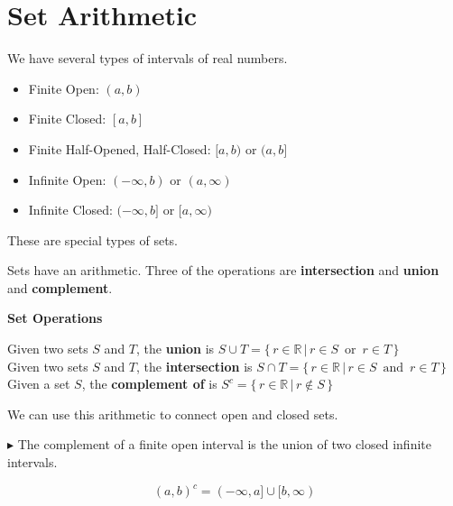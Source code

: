 \documentclass{ximera}
\begin{document}
\section{Set Arithmetic}


We have several types of intervals of real numbers.


\begin{itemize}
\item Finite Open:   $(a, b)$
\item Finite Closed: $[a, b]$
\item Finite Half-Opened, Half-Closed:  $[a, b)$  or $(a,b]$ \\

\item Infinite Open: $(-\infty, b)$ or $(a, \infty)$
\item Infinite Closed: $(-\infty, b]$ or $[a, \infty)$

\end{itemize}

These are special types of sets.


Sets have an arithmetic. Three of the operations are \textbf{intersection} and \textbf{union} and \textbf{complement}.



\begin{definition} \textbf{\textcolor{green!50!black}{Set Operations}} 


Given two sets $S$ and $T$, the \textbf{union} is $S \cup T = \{ \, r \in \mathbb{R} \, | \, r \in S \, \text{ or } \, r \in T  \,   \}$ \\

Given two sets $S$ and $T$, the \textbf{intersection} is $S \cap T = \{ \, r \in \mathbb{R} \, | \, r \in S \, \text{ and } \, r \in T  \,   \}$ \\
 
Given a set $S$, the \textbf{complement of} is $S^{c}  = \{ \, r \in \mathbb{R} \, | \, r \not\in S \,  \}$ 


\end{definition}







We can use this arithmetic to connect open and closed sets.

$\blacktriangleright$ The complement of a finite open interval is the union of two closed infinite intervals.

\[    (a,b)^{c}  = (-\infty, a] \cup [b, \infty)          \]
\end{document}
